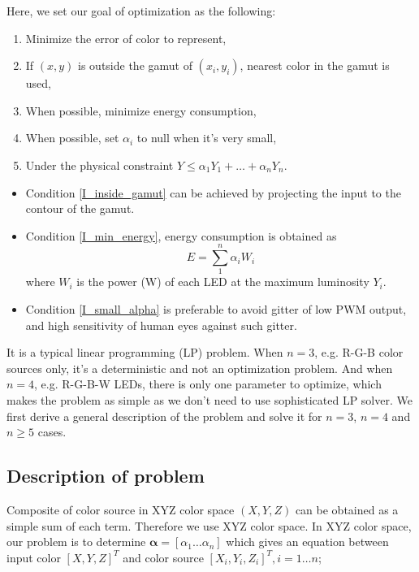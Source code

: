 \documentclass[dvipdfmx,uplatex]{article}
\begin{document}
Here, we set our goal of optimization as the following:
\begin{enumerate}
  \item Minimize the error of color to represent,
  \item\label{I_inside_gamut} If $(x, y)$ is outside the gamut of $(x_i, y_i)$, nearest color in the gamut is used,
  \item\label{I_min_energy} When possible, minimize energy consumption,
  \item\label{I_small_alpha} When possible, set $\alpha_i$ to null when it's very small,
  \item\label{I_max_luminance} Under the physical constraint $Y \leq \alpha_1 Y_1 + \ldots + \alpha_n Y_n$.
\end{enumerate}

\begin{itemize}
  \item Condition \ref{I_inside_gamut} can be achieved by projecting the input to the contour of the gamut.
  \item Condition \ref{I_min_energy}, energy consumption is obtained as
  \begin{equation}
    \label{E_min_energy}
    E = \sum_1^n \alpha_i W_i
  \end{equation}
  where $W_i$ is the power (W) of each LED at the maximum luminosity $Y_i$.
  \item Condition \ref{I_small_alpha} is preferable to avoid gitter of low PWM output, and high sensitivity of human eyes against such gitter.
\end{itemize}

It is a typical linear programming (LP) problem. When $n=3$, e.g. R-G-B color sources only, it's a deterministic and not an optimization problem. And when $n=4$, e.g. R-G-B-W LEDs, there is only one parameter to optimize, which makes the problem as simple as we don't need to use sophisticated LP solver. We first derive a general description of the problem and solve it for $n=3$, $n=4$ and $n \geq 5$ cases.

\subsection{Description of problem}
Composite of color source in XYZ color space $(X, Y, Z)$ can be obtained as a simple sum of each term. Therefore we use XYZ color space. In XYZ color space, our problem is to determine $\boldsymbol{\alpha} = [\alpha_1 \ldots \alpha_n]$ which gives an equation between input color $[X, Y, Z]^T$ and color source $[X_{i}, Y_{i}, Z_{i}]^T, i=1 \ldots n$;
\end{document}
